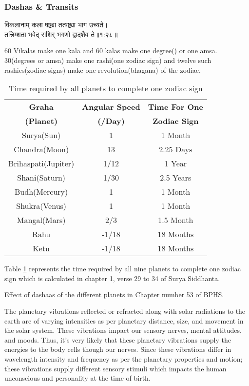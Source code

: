 \subsubsection{Dashas \& Transits}
\begin{sanskrit}
	\begin{center}
		विकलानाम् कला षष्ट्या तत्षष्ट्या भाग उच्यते।\\तत्त्रिम्शता भवेद् राशिर् भगणो द्वादशैव ते॥१:२८॥\cite{SuryaSiddhanta}\cite{wiki:ss}
	\end{center}
\end{sanskrit}
60 Vikalas make one kala and 60 kalas make one degree(\textdegree) or one amsa. 30\textdegree(degrees or amsa) make one rashi(one zodiac sign) and twelve such rashies(zodiac signs) make one revolution(bhagana) of the zodiac.

\begin{table}[H]
	\begin{tabular}{|c|c|c|}
		\hline
		\textbf{Graha} & \textbf{Angular Speed} & \textbf{Time For One} \\
		\textbf{(Planet)} & \textbf{(\textdegree/Day)} & \textbf{Zodiac Sign}\\
		\hline
		Surya(Sun) & 1 & 1 Month \\
		\hline
		Chandra(Moon) & 13 & 2.25 Days \\
		\hline
		Brihaspati(Jupiter) & 1/12 & 1 Year \\
		\hline
		Shani(Saturn) & 1/30 & 2.5 Years \\
		\hline
		Budh(Mercury) & 1 & 1 Month \\
		\hline
		Shukra(Venus) & 1 & 1 Month \\
		\hline
		Mangal(Mars) & 2/3 & 1.5 Month \\
		\hline
		Rahu & -1/18 & 18 Months \\
		\hline
		Ketu & -1/18 & 18 Months \\
		\hline
	\end{tabular}
	\caption{Time required by all planets to complete one zodiac sign}
	\label{Table:table}
\end{table}

Table \ref{Table:table} represents the time required by all nine planets to complete one zodiac sign which is calculated in chapter 1, verse 29 to 34 of Surya Siddhanta\cite{SuryaSiddhanta}\cite{wiki:ss}.

Effect of dashaas of the different planets in Chapter number 53 of BPHS.

The planetary vibrations reflected or refracted along with solar radiations to the earth are of varying intensities as per planetary distance, size, and movement in the solar system. These vibrations impact our sensory nerves, mental attitudes, and moods. Thus, it’s very likely that these planetary vibrations supply the energies to the body cells though our nerves. Since these vibrations differ in wavelength intensity and frequency as per the planetary properties and motion; these vibrations supply different sensory stimuli which impacts the human unconscious and personality at the time of birth\cite{article}.
